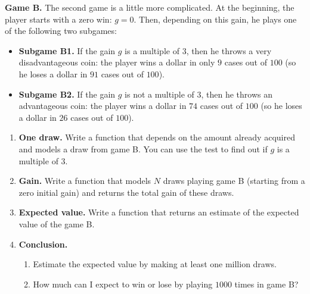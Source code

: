 \documentclass[11pt,class=report,crop=false]{standalone}
\begin{document}
  



\begin{activite}


\textbf{Game B.} The second game is a little more complicated. At the beginning, the player starts with a zero win: $g=0$. Then, depending on this gain, he plays one of the following two subgames:
\begin{itemize}
  \item \textbf{Subgame B1.} If the gain $g$ is a multiple of $3$, then he throws a very disadvantageous coin: the player wins a dollar in only $9$ cases out of $100$ (so he loses a dollar in $91$ cases out of $100$).
  
  \item \textbf{Subgame B2.} If the gain $g$ is not a multiple of $3$, then he throws an advantageous coin: the player wins a dollar in $74$ cases out of $100$ (so he loses a dollar in $26$ cases out of $100$).
\end{itemize}

\begin{enumerate}
  \item \textbf{One draw.}
  Write a  function that depends on the amount already acquired and models a draw from game B. You can use the  test to find out if $g$ is a multiple of $3$.
  
  \item \textbf{Gain.} Write a  function that models $N$ draws playing game B (starting from a zero initial gain) and returns the total gain of these draws.
  
 
  
  \item \textbf{Expected value.} Write a function  that returns an estimate of the expected value of the game B.
  
  \item \textbf{Conclusion.}
  \begin{enumerate}
    \item Estimate the expected value by making at least one million draws.
    \item How much can I expect to win or lose by playing $1000$ times in game B?
  \end{enumerate}

\end{enumerate}

\end{activite}
\end{document}
